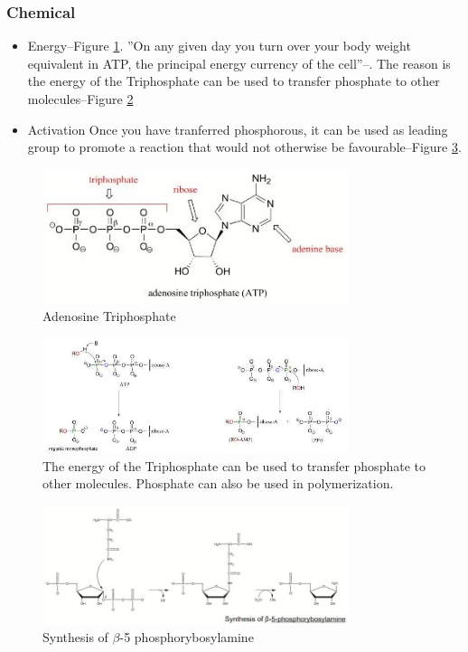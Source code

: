 \documentclass[]{article}
\begin{document}
\subsubsection{Chemical}

\begin{itemize}
	\item Energy--Figure \ref{fig:ATP}. ''On any given day you turn over your body weight equivalent in ATP, the principal energy currency of the cell''--\cite{tornroth2008opening}. The reason is the energy of the Triphosphate can be used to transfer phosphate to other molecules--Figure \ref{fig:ATP1}
	\item Activation Once you have tranferred phosphorous, it can be used as leading group to promote a reaction that would not otherwise be favourable--Figure \ref{fig:Synthesis-beta-5-phosphorybosylamine}. 
\end{itemize}

\begin{figure}[H]
	\caption{Adenosine Triphosphate}\label{fig:ATP}
	\includegraphics[width=0.8\textwidth]{ATP}
\end{figure}

\begin{figure}[H]
	\caption[ATP transferring phosphate to other molecules]{The energy of the Triphosphate can be used to transfer phosphate to other molecules. Phosphate can also be used in polymerization.}\label{fig:ATP1}
	\includegraphics[width=0.8\textwidth]{ATP1}
\end{figure}

\begin{figure}[H]
	\caption{Synthesis of $\beta$-5 phosphorybosylamine}\label{fig:Synthesis-beta-5-phosphorybosylamine}
	\includegraphics[width=0.8\textwidth]{Synthesis-beta-5-phosphorybosylamine}
\end{figure}
\end{document}
